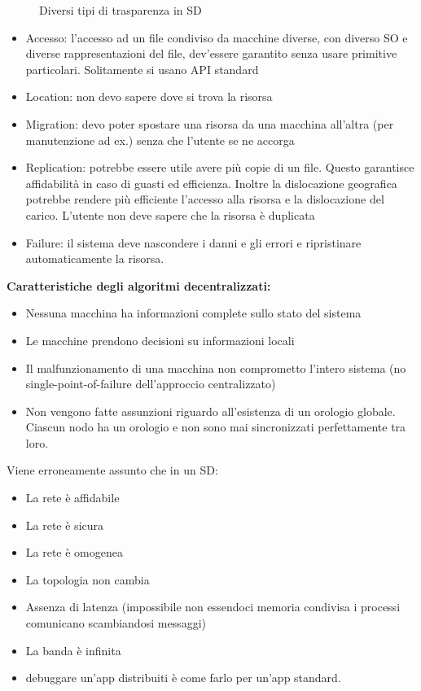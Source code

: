\documentclass[12pt,italian]{report}
\begin{document}
\begin{enumerate}
\begin{figure}[h]
    \caption{Diversi tipi di trasparenza in SD}
    \label{fig:trasparenza}
    \end{figure}
    \begin{itemize}
        \item Accesso: l'accesso ad un file condiviso da macchine diverse, con diverso SO e diverse rappresentazioni del file, dev'essere garantito senza usare primitive particolari. Solitamente si usano API standard
        \item Location: non devo sapere dove si trova la risorsa
        \item Migration: devo poter spostare una risorsa da una macchina all'altra (per manutenzione ad ex.) senza che l'utente se ne accorga
        \item Replication: potrebbe essere utile avere più copie di un file. Questo garantisce affidabilità in caso di guasti ed efficienza. Inoltre la dislocazione geografica potrebbe rendere più efficiente l'accesso alla risorsa e la dislocazione del carico. L'utente non deve sapere che la risorsa è duplicata
        \item Failure: il sistema deve nascondere i danni e gli errori e ripristinare automaticamente la risorsa. 
    \end{itemize}
\end{enumerate}

\noindent \textbf{Caratteristiche degli algoritmi decentralizzati:}
\begin{itemize}
    \item Nessuna macchina ha informazioni complete sullo stato del sistema
    \item Le macchine prendono decisioni su informazioni locali
    \item Il malfunzionamento di una macchina non comprometto l'intero sistema (no single-point-of-failure dell'approccio centralizzato)
    \item Non vengono fatte assunzioni riguardo all'esistenza di un orologio globale. Ciascun nodo ha un orologio e non sono mai sincronizzati perfettamente tra loro. 
\end{itemize}
Viene erroneamente assunto che in un SD:
\begin{itemize}
    \item La rete è affidabile
    \item La rete è sicura
    \item La rete è omogenea
    \item La topologia non cambia
    \item Assenza di latenza (impossibile non essendoci memoria condivisa i processi comunicano scambiandosi messaggi)
    \item La banda è infinita
    \item debuggare un'app distribuiti è come farlo per un'app standard.
\end{itemize}
\end{document}
